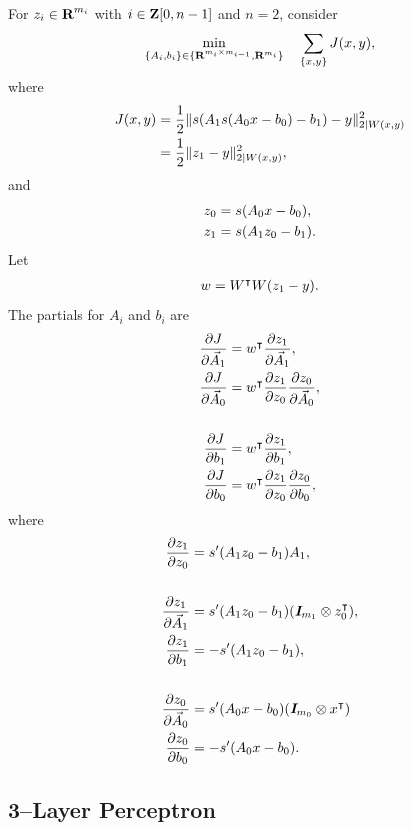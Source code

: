 \documentclass{article}
\begin{document}
    For $z_i\in\textbf{R}^{m_i}$ with $i\in\textbf{Z}[0,n-1]$ and $n=2$, consider
    \begin{align*}
        \min_{\{A_i,b_i\}\in\{\textbf{R}^{m_i\times m_{i-1}},\textbf{R}^{m_i}\}}\quad 
        \sum_{\{x,y\}}
        J (x,y),
    \end{align*}
    where
    \begin{align*}
        J(x,y)&=\frac{1}{2}\|s(A_1s(A_0x -b_0)-b_1)-y \|_{2|W(x,y)}^2\\
        &=\frac{1}{2}\|z_1-y \|_{2|W(x,y)}^2,        
    \end{align*}
    and
    \begin{align*}
        z_0&=s(A_0x -b_0),\\
        z_1&=s(A_1z_0-b_1).
    \end{align*}
    Let
    \begin{align*}
        w=W^\intercal W (z_1-y ).
    \end{align*}
    The partials for $A_i$ and $b_i$ are
    \begin{align*}
        \frac{\partial  J }{\partial \vec{A}_1}&=w^\intercal  \frac{\partial z_1}{\partial \vec{A}_1},\\
        \frac{\partial  J }{\partial \vec{A}_0}&=w^\intercal  \frac{\partial z_1}{\partial z_0}\frac{\partial z_0 }{\partial \vec{A}_0},\\
        \\
        \frac{\partial  J }{\partial b_1}&=w^\intercal  \frac{\partial z_1}{\partial b_1},\\
        \frac{\partial  J }{\partial b_0}&=w^\intercal  \frac{\partial z_1}{\partial z_0}\frac{\partial z_0 }{\partial b_0},
    \end{align*}
    where
    \begin{align*}
        \frac{\partial z_1}{\partial z_0}&=s'(A_1z_0 -b_1)A_1,\\\\
        \frac{\partial z_1}{\partial \vec{A}_1}&=s'(A_1z_0 -b_1)(\emph{\textbf{I}}_{m_1}\otimes z_0 ^\intercal),\\
        \frac{\partial z_1}{\partial b_1}&=-s'(A_1z_0 -b_1),\\\\
        \frac{\partial z_0}{\partial \vec{A}_0}&=s'(A_0x -b_0)( \emph{\textbf{I}}_{m_0} \otimes x ^\intercal)\\
        \frac{\partial z_0}{\partial b_0}&=-s'(A_0x -b_0).
    \end{align*}
    
\subsection{3--Layer Perceptron}\label{sec:nn3}
\end{document}
